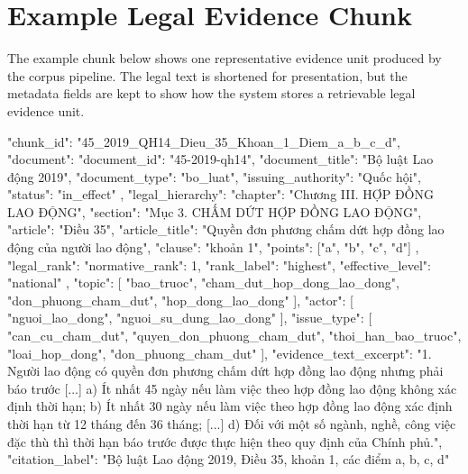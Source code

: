 \section{Example Legal Evidence Chunk}
\label{appendix:evidence-chunk}

The example chunk below shows one representative evidence unit produced by the
corpus pipeline. The legal text is shortened for presentation, but the metadata
fields are kept to show how the system stores a retrievable legal evidence
unit.

\begin{ThesisCode}
{
  "chunk_id": "45_2019_QH14_Dieu_35_Khoan_1_Diem_a_b_c_d",
  "document": {
    "document_id": "45-2019-qh14",
    "document_title": "Bộ luật Lao động 2019",
    "document_type": "bo_luat",
    "issuing_authority": "Quốc hội",
    "status": "in_effect"
  },
  "legal_hierarchy": {
    "chapter": "Chương III. HỢP ĐỒNG LAO ĐỘNG",
    "section": "Mục 3. CHẤM DỨT HỢP ĐỒNG LAO ĐỘNG",
    "article": "Điều 35",
    "article_title": "Quyền đơn phương chấm dứt hợp đồng lao động của người lao động",
    "clause": "khoản 1",
    "points": ["a", "b", "c", "d"]
  },
  "legal_rank": {
    "normative_rank": 1,
    "rank_label": "highest",
    "effective_level": "national"
  },
  "topic": [
    "bao_truoc",
    "cham_dut_hop_dong_lao_dong",
    "don_phuong_cham_dut",
    "hop_dong_lao_dong"
  ],
  "actor": [
    "nguoi_lao_dong",
    "nguoi_su_dung_lao_dong"
  ],
  "issue_type": [
    "can_cu_cham_dut",
    "quyen_don_phuong_cham_dut",
    "thoi_han_bao_truoc",
    "loai_hop_dong",
    "don_phuong_cham_dut"
  ],
  "evidence_text_excerpt": "1. Người lao động có quyền đơn phương chấm dứt hợp đồng lao động nhưng phải báo trước [...] a) Ít nhất 45 ngày nếu làm việc theo hợp đồng lao động không xác định thời hạn; b) Ít nhất 30 ngày nếu làm việc theo hợp đồng lao động xác định thời hạn từ 12 tháng đến 36 tháng; [...] d) Đối với một số ngành, nghề, công việc đặc thù thì thời hạn báo trước được thực hiện theo quy định của Chính phủ.",
  "citation_label": "Bộ luật Lao động 2019, Điều 35, khoản 1, các điểm a, b, c, d"
}
\end{ThesisCode}
